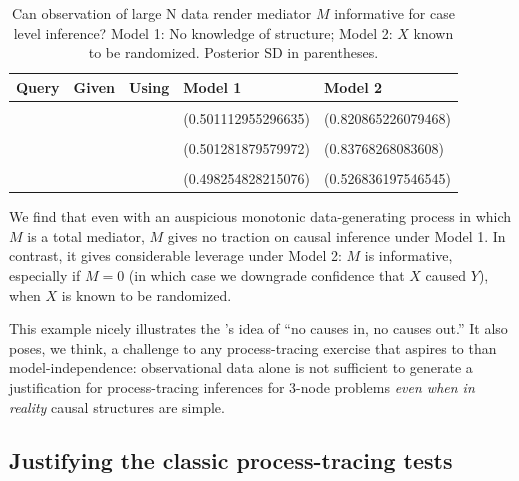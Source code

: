\documentclass[
  12pt,
]{book}
\begin{document}
\begin{table}

\caption{\label{tab:unnamed-chunk-39}Can observation of large N data render mediator $M$ informative for case level inference? Model 1: No knowledge of structure; Model 2: $X$ known to be randomized. Posterior SD in parentheses.}
\centering
\begin{tabular}[t]{lllll}
\toprule
Query & Given & Using & Model 1 & Model 2\\
\midrule
\cellcolor{gray!6}{Q 1} & \cellcolor{gray!6}{X==1 \& Y==1} & \cellcolor{gray!6}{posteriors} & \cellcolor{gray!6}{FALSE} & \cellcolor{gray!6}{FALSE}\\
 &  &  & (0.501112955296635) & (0.820865226079468)\\
\cellcolor{gray!6}{Q 1} & \cellcolor{gray!6}{X==1 \& M==1 \& Y==1} & \cellcolor{gray!6}{posteriors} & \cellcolor{gray!6}{FALSE} & \cellcolor{gray!6}{FALSE}\\
 &  &  & (0.501281879579972) & (0.83768268083608)\\
\cellcolor{gray!6}{Q 1} & \cellcolor{gray!6}{X==1 \& M==0 \& Y==1} & \cellcolor{gray!6}{posteriors} & \cellcolor{gray!6}{FALSE} & \cellcolor{gray!6}{FALSE}\\
\addlinespace
 &  &  & (0.498254828215076) & (0.526836197546545)\\
\bottomrule
\end{tabular}
\end{table}

We find that even with an auspicious monotonic data-generating process in which \(M\) is a total mediator, \(M\) gives no traction on causal inference under Model 1. In contrast, it gives considerable leverage under Model 2: \(M\) is informative, especially if \(M=0\) (in which case we downgrade confidence that \(X\) caused \(Y\)), when \(X\) is known to be randomized.

This example nicely illustrates the \citet{cartwright1994nature}'s idea of ``no causes in, no causes out.'' It also poses, we think, a challenge to any process-tracing exercise that aspires to than model-independence: observational data alone is not sufficient to generate a justification for process-tracing inferences for 3-node problems \emph{even when in reality} causal structures are simple.

\hypertarget{justifying-the-classic-process-tracing-tests}{%
\subsection{Justifying the classic process-tracing tests}\label{justifying-the-classic-process-tracing-tests}}
\end{document}
